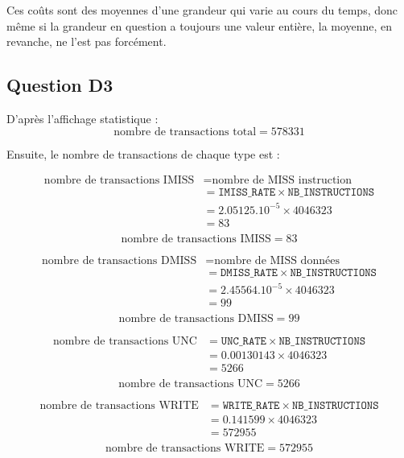 \documentclass{article}
\begin{document}
Ces coûts sont des moyennes d'une grandeur qui varie au cours du temps, donc même si la grandeur en question a toujours une valeur entière, la moyenne, en revanche, ne l'est pas forcément.

\subsection{Question D3}

D'après l'affichage statistique :
$$\boxed{\text{nombre de transactions total} = 578331}$$

Ensuite, le nombre de transactions de chaque type est :

\begin{align*}
\text{nombre de transactions IMISS} &= \text{nombre de MISS instruction} \\
				    &= \texttt{IMISS\_RATE} \times \texttt{NB\_INSTRUCTIONS} \\
				    &= 2.05125.10^{-5} \times 4046323 \\
				    &= 83 \\
\end{align*}
$$\boxed{\text{nombre de transactions IMISS} = 83}$$

\begin{align*}
\text{nombre de transactions DMISS} &= \text{nombre de MISS données} \\
				    &= \texttt{DMISS\_RATE} \times \texttt{NB\_INSTRUCTIONS} \\
				    &= 2.45564.10^{-5} \times 4046323 \\
				    &= 99 \\
\end{align*}
$$\boxed{\text{nombre de transactions DMISS} = 99}$$

\begin{align*}
\text{nombre de transactions UNC} &= \texttt{UNC\_RATE} \times \texttt{NB\_INSTRUCTIONS} \\
				    &= 0.00130143 \times 4046323 \\
				    &= 5266 \\
\end{align*}
$$\boxed{\text{nombre de transactions UNC} = 5266}$$

\begin{align*}
\text{nombre de transactions WRITE} &= \texttt{WRITE\_RATE} \times \texttt{NB\_INSTRUCTIONS} \\
				    &= 0.141599 \times 4046323 \\
				    &= 572955 \\
\end{align*}
$$\boxed{\text{nombre de transactions WRITE} = 572955}$$
\end{document}
